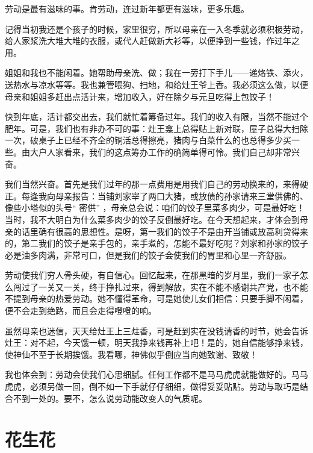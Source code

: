 \documentclass[12pt,UTF-8,openany]{ctexbook}
\begin{document}
\begin{Large}
    
    劳动是最有滋味的事。肯劳动，连过新年都更有滋味，更多乐趣。
    
    记得当初我还是个孩子的时候，家里很穷，所以母亲在一入冬季就必须积极劳动，给人家浆洗大堆大堆的衣服，或代人赶做新大衫等，以便挣到一些钱，作过年之用。
    
    姐姐和我也不能闲着。她帮助母亲洗、做；我在一旁打下手儿——递烙铁、添火，送热水与凉水等等。我也兼管喂狗、扫地，和给灶王爷上香。我必须这么做，以便母亲和姐姐多赶出点活计来，增加收入，好在除夕与元旦吃得上包饺子！
    
    快到年底，活计都交出去，我们就忙着筹备过年。我们的收入有限，当然不能过个肥年。可是，我们也有非办不可的事：灶王龛上总得贴上新对联，屋子总得大扫除一次，破桌子上已经不齐全的铜活总得擦亮，猪肉与白菜什么的也总得多少买一些。由大户人家看来，我们的这点筹办工作的确简单得可怜。我们自己却非常兴奋。
    
    我们当然兴奋。首先是我们过年的那一点费用是用我们自己的劳动换来的，来得硬正。每逢我向母亲报告：当铺刘家宰了两口大猪，或放债的孙家请来三堂供佛的、像些小塔似的头号“ 密供” ，母亲总会说：咱们的饺子里菜多肉少，可是最好吃！当时，我不大明白为什么菜多肉少的饺子反倒最好吃。在今天想起来，才体会到母亲的话里确有很高的思想性。是呀，第一我们的饺子不是由开当铺或放高利贷得来的，第二我们的饺子是亲手包的，亲手煮的，怎能不最好吃呢？刘家和孙家的饺子必是油多肉满，非常可口，但是我们的饺子会使我们的胃里和心里一齐舒服。
    
    劳动使我们穷人骨头硬，有自信心。回忆起来，在那黑暗的岁月里，我们一家子怎么闯过了一关又一关，终于挣扎过来，得到解放，实在不能不感谢共产党，也不能不提到母亲的热爱劳动。她不懂得革命，可是她使儿女们相信：只要手脚不闲着，便不会走到绝路，而且会走得噔噔的响。
    
    虽然母亲也迷信，天天给灶王上三炷香，可是赶到实在没钱请香的时节，她会告诉灶王：对不起，今天饿一顿，明天我挣来钱再补上吧！是的，她自信能够挣来钱，使神仙不至于长期挨饿。我看哪，神佛似乎倒应当向她致谢、致敬！
    
    我也体会到：劳动会使我们心思细腻。任何工作都不是马马虎虎就能做好的。马马虎虎，必须另做一回，倒不如一下手就仔仔细细，做得妥妥贴贴。劳动与取巧是结合不到一处的。要不，怎么说劳动能改变人的气质呢。
    
\end{Large}

\chapter{花生花}
\end{document}

